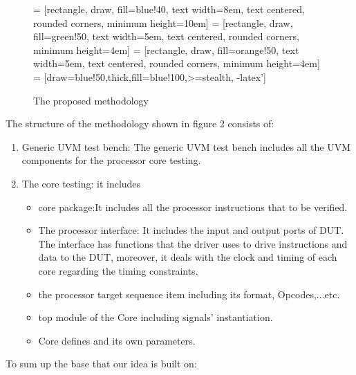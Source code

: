 \documentclass[conference,10 pt,twoside]{IEEEtran}
\begin{document}
\begin{center}
\begin{figure}[h]
\centering
{} = [rectangle, draw, fill=blue!40, text width=8em, text centered, rounded corners, minimum height=10em]
 = [rectangle, draw, fill=green!50, text width=5em, text centered, rounded corners, minimum height=4em]
 = [rectangle, draw, fill=orange!50, text width=5em, text centered, rounded corners, minimum height=4em]
 = [draw=blue!50,thick,fill=blue!100,>=stealth, -latex']
\caption{The proposed methodology} 
  
\label{Figure:tikzpicture} 
\end{figure}
\end{center}
The structure of the methodology shown in figure 2 consists of:
\begin{enumerate}
\item Generic UVM test bench:
The generic UVM test bench includes all the UVM components for the processor core testing.
\item The core testing:
it includes\begin{itemize}
\item core package:It includes all the processor instructions that to be verified.\item The processor interface: 
It includes the input and output ports of DUT. The interface has functions that the driver uses to drive instructions and data to the DUT, moreover, it deals with the clock and timing of each core regarding the timing constraints. \item the processor target sequence item including its format, Opcodes,...etc.\item top module of the Core including signals' instantiation.\item Core defines and its own parameters.
\end{itemize} 
\end{enumerate}
To sum up the base that our idea is built on:
\end{document}
